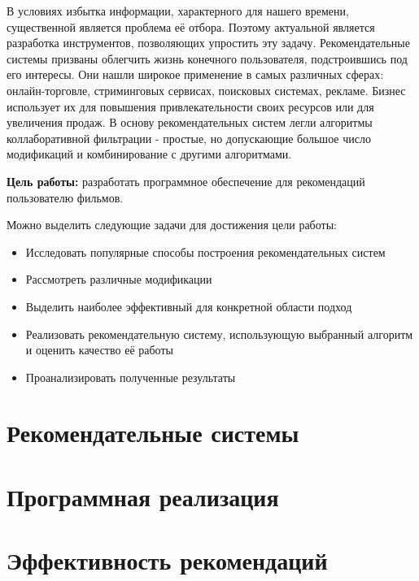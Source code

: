 \documentclass[a4paper,article,14pt]{extarticle}
\begin{document}


\tableofcontents
\pagebreak


В условиях избытка информации, характерного для нашего времени, существенной является проблема её отбора.
Поэтому актуальной является разработка инструментов, позволяющих упростить эту задачу.
Рекомендательные системы призваны облегчить жизнь конечного пользователя, подстроившись под его интересы.
Они нашли широкое применение в самых различных сферах: онлайн-торговле, стриминговых сервисах, поисковых системах, рекламе.
Бизнес использует их для повышения привлекательности своих ресурсов или для увеличения продаж.
В основу рекомендательных систем легли алгоритмы коллаборативной фильтрации - простые, но допускающие большое число модификаций и комбинирование с другими алгоритмами.


\textbf{Цель работы:} разработать программное обеспечение для рекомендаций пользователю фильмов.

Можно выделить следующие задачи для достижения цели работы:
\begin{itemize}
\item Исследовать популярные способы построения рекомендательных систем
\item Рассмотреть различные модификации
\item Выделить наиболее эффективный для конкретной области подход
\item Реализовать рекомендательную систему, использующую выбранный алгоритм и оценить качество её работы
\item Проанализировать полученные результаты

\end{itemize}
\pagebreak
\section{Рекомендательные системы}\label{sec:recommender_systems}


\pagebreak
\section{Программная реализация}\label{sec:program_realization}


\pagebreak
\section{Эффективность рекомендаций}\label{sec:algos_efficiency}

\end{document}
